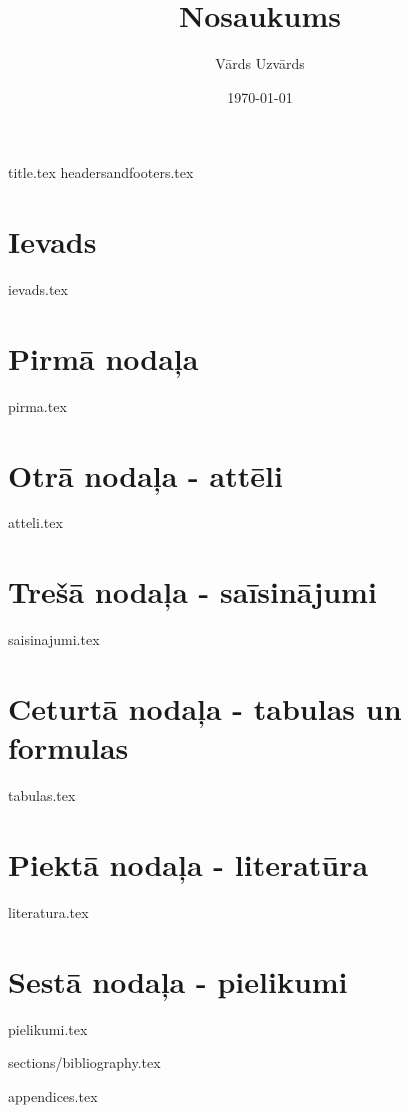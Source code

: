 \documentclass[a4paper,12pt]{article}
\author{Vārds Uzvārds}
\title{Nosaukums}
\date{\today}
\begin{document}
{title.tex}                  %
\pagebreak
{headersandfooters.tex}      %
\printglossaries	                    %
\setcounter{page}{2} 
\pagebreak
\tableofcontents
\thispagestyle{fancy}                   %
\pagebreak
\section*{Ievads}
{ievads.tex}

\section{Pirmā nodaļa}
{pirma.tex}

\section{Otrā nodaļa - attēli}
{atteli.tex}

\section{Trešā nodaļa - saīsinājumi}
{saisinajumi.tex}

\section{Ceturtā nodaļa - tabulas un formulas}
{tabulas.tex}

\section{Piektā nodaļa - literatūra}
{literatura.tex}

\section{Sestā nodaļa - pielikumi}
{pielikumi.tex}

{sections/bibliography.tex}

{appendices.tex}
\end{document}
